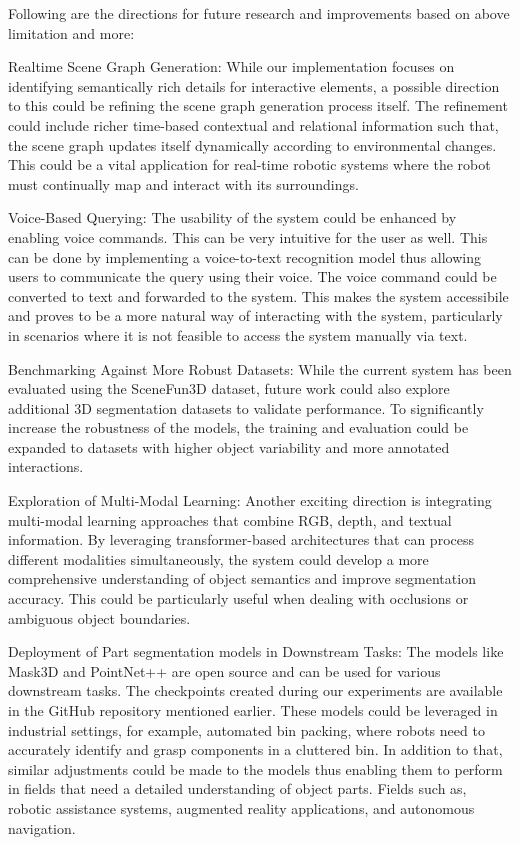 Following are the directions for future research and improvements based on above limitation and more: 
\begin{compactenum}[1.]
\item Realtime Scene Graph Generation:
While our implementation focuses on identifying semantically rich details for interactive elements, a possible direction to this 
could be refining the scene graph generation process itself. The refinement could include richer time-based contextual and relational information
    such that, the scene graph updates itself dynamically according to environmental changes. This could be a vital application for real-time 
    robotic systems where the robot must continually map and interact with its surroundings. 
\item Voice-Based Querying:
The usability of the system could be enhanced by enabling voice commands. This can be very intuitive for the user as well.
This can be done by implementing a voice-to-text recognition model thus allowing users to communicate the query using their voice.
The voice command could be converted to text and forwarded to the system. This makes the system accessibile and proves to be a 
more natural way of interacting with the system, particularly in scenarios where it is not feasible to access the system manually via text.
\item Benchmarking Against More Robust Datasets:
While the current system has been evaluated using the SceneFun3D dataset, future work could also explore additional 3D 
segmentation datasets to validate performance. To significantly increase the robustness of the models, the training and evaluation could be 
expanded to datasets with higher object variability and more annotated interactions.

\item Exploration of Multi-Modal Learning:
Another exciting direction is integrating multi-modal learning approaches that combine RGB, depth, and textual information.
 By leveraging transformer-based architectures that can process different modalities simultaneously, 
 the system could develop a more comprehensive understanding of object semantics and improve segmentation accuracy.
  This could be particularly useful when dealing with occlusions or ambiguous object boundaries.
  \item Deployment of Part segmentation models in Downstream Tasks:
  The models like Mask3D and PointNet++ are open source and can be used for various downstream tasks. The checkpoints created during 
  our experiments are available in the GitHub repository mentioned earlier. These models could be leveraged in industrial settings, for example,
  automated bin packing, where robots need to accurately identify and grasp components in a cluttered bin. In addition to that, similar
  adjustments could be made to the models thus enabling them to perform in fields that need a detailed understanding of object parts.
  Fields such as, robotic assistance systems, augmented reality applications, and autonomous navigation.
\end{compactenum}
